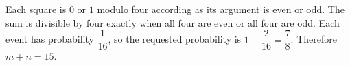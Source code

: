 Each square is $0$ or $1$ modulo four according as its argument is even or odd. The sum is divisible by four exactly when all four are even or all four are odd. Each event has probability $\dfrac{1}{16}$, so the requested probability is $1-\dfrac{2}{16}=\dfrac{7}{8}$. Therefore $\boxed{m+n=15}$.
